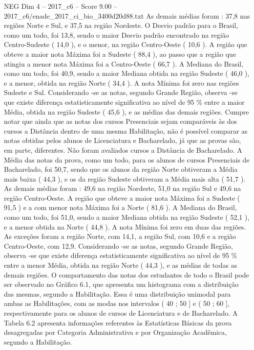 \begin{textsample}{NEG Dim 4 – 2017\_c6 – Score 9.00 – 2017\_c6/enade\_2017\_ci\_bio\_3400d20d88.txt}
As demais médias foram : 37,8 nas regiões Norte e Sul, e 37,5 na região Nordeste.
O Desvio padrão para o Brasil, como um todo, foi 13,8, sendo o maior Desvio padrão encontrado na região Centro-Sudeste ( 14,0 ), e o menor, na região Centro-Oeste ( 10,6 ).
A região que obteve a maior nota Máxima foi a Sudeste ( 88,4 ), ao passo que a região que atingiu a menor nota Máxima foi a Centro-Oeste ( 66,7 ).
A Mediana do Brasil, como um todo, foi 40,9, sendo a maior Mediana obtida na região Sudeste ( 46,0 ), e a menor, obtida na região Norte ( 34,4 ).
A nota Mínima foi zero nas regiões Sudeste e Sul.
Considerando -se as notas, segundo Grande Região, observa -se que existe diferença estatisticamente significativa ao nível de 95 \% entre a maior Média, obtida na região Sudeste ( 45,6 ), e as médias das demais regiões.
Cumpre notar que ainda que as notas dos cursos Presenciais sejam comparáveis às dos cursos a Distância dentro de uma mesma Habilitação, não é possível comparar as notas obtidas pelos alunos de Licenciatura e Bacharelado, já que as provas são, em parte, diferentes.
Não foram avaliados cursos a Distância de Bacharelado.
A Média das notas da prova, como um todo, para os alunos de cursos Presenciais de Bacharelado, foi 50,7, sendo que os alunos da região Norte obtiveram a Média mais baixa ( 44,3 ), e os da região Sudeste obtiveram a Média mais alta ( 51,7 ).
As demais médias foram : 49,6 na região Nordeste, 51,0 na região Sul e 49,6 na região Centro-Oeste.
A região que obteve a maior nota Máxima foi a Sudeste ( 91,5 ) e a com menor nota Máxima foi a Norte ( 81,6 ).
A Mediana do Brasil, como um todo, foi 51,0, sendo a maior Mediana obtida na região Sudeste ( 52,1 ), e a menor obtida na Norte ( 44,8 ).
A nota Mínima foi zero em duas das regiões.
As exceções foram a região Norte, com 14,1, a região Sul, com 10,6 e a região Centro-Oeste, com 12,9.
Considerando -se as notas, segundo Grande Região, observa -se que existe diferença estatisticamente significativa ao nível de 95 \% entre a menor Média, obtida na região Norte ( 44,3 ), e as médias de todas as demais regiões.
O comportamento das notas dos estudantes de todo o Brasil pode ser observado no Gráfico 6.1, que apresenta um histograma com a distribuição das mesmas, segundo a Habilitação.
Essa é uma distribuição unimodal para ambas as Habilitações, com as modas nos intervalos ( 40 ; 50 ] e ( 50 ; 60 ], respectivamente para os alunos de cursos de Licenciatura e de Bacharelado.
A Tabela 6.2 apresenta informações referentes às Estatísticas Básicas da prova desagregadas por Categoria Administrativa e por Organização Acadêmica, segundo a Habilitação.

\end{textsample}
